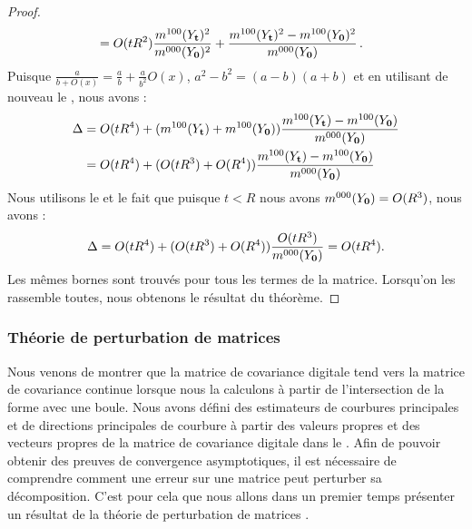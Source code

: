 \begin{proof}
\begin{align}
    &= O(tR^2)\frac{m^{100}(Y_{\mathbf{t}})^2}{m^{000}(Y_{\mathbf{0}})^2} +
    \frac{m^{100}(Y_{\mathbf{t}})^2 - m^{100}(Y_{\mathbf{0}})^2}{m^{000}(Y_{\mathbf{0}})}\,.
  \end{align}
  Puisque $\frac{a}{b+O(x)}=\frac{a}{b}+\frac{a}{b^2}O(x)$, $a^2-b^2=(a-b)(a+b)$
  et en utilisant de nouveau le , nous
  avons :
  \begin{align*}
    \Delta
    &= O(tR^4) + (m^{100}(Y_{\mathbf{t}}) + m^{100}(Y_{\mathbf{0}}))\frac{m^{100}(Y_{\mathbf{t}}) - m^{100}(Y_{\mathbf{0}})}{m^{000}(Y_{\mathbf{0}})} \\
    &= O(tR^4) + (O(tR^3)+O(R^4))\frac{m^{100}(Y_{\mathbf{t}}) - m^{100}(Y_{\mathbf{0}})}{m^{000}(Y_{\mathbf{0}})}
  \end{align*}
  Nous utilisons le  et le fait que
  puisque $t < R$ nous avons $m^{000}(Y_{\mathbf{0}}) = O(R^3)$, nous avons :
  \begin{equation}
    \Delta = O(tR^4) + (O(tR^3)+O(R^4))\frac{O(tR^3)}{m^{000}(Y_{\mathbf{0}})} = O(tR^4).
  \end{equation}
  Les mêmes bornes sont trouvés pour tous les termes de la matrice. Lorsqu'on
  les rassemble toutes, nous obtenons le résultat du théorème.
  \end{proof}
%
\subsubsection{Théorie de perturbation de matrices}
%
Nous venons de montrer que la matrice de covariance digitale tend vers la
matrice de covariance continue lorsque nous la calculons à partir de
l'intersection de la forme avec une boule. Nous avons défini des estimateurs de
courbures principales et de directions principales de courbure à partir des
valeurs propres et des vecteurs propres de la matrice de covariance digitale
dans le . Afin de pouvoir obtenir des
preuves de convergence asymptotiques, il est nécessaire de comprendre comment une
erreur sur une matrice peut perturber sa décomposition. C'est pour cela que nous
allons dans un premier temps présenter un résultat de la théorie de perturbation
de matrices \cite{Bauer1960,Stewart1990,Bhatia1997}.


